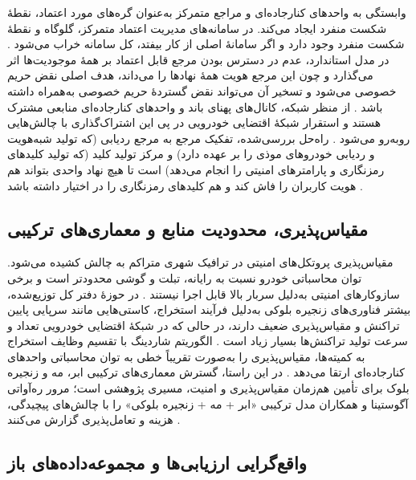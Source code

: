 \documentclass[12pt,a4paper]{article}
\begin{document}
وابستگی به واحد‌های کنارجاده‌ای  و مراجع متمرکز به‌عنوان گره‌های مورد اعتماد، نقطهٔ شکست منفرد  ایجاد می‌کند. در سامانه‌های مدیریت اعتماد متمرکز، گلوگاه و نقطهٔ شکست منفرد وجود دارد و اگر سامانهٔ اصلی از کار بیفتد، کل سامانه خراب می‌شود \cite{ghovanlooyghajarSBTMSScalableBlockchain2021}. در مدل استاندارد، عدم در دسترس بودن مرجع قابل اعتماد بر همهٔ موجودیت‌ها اثر می‌گذارد و چون این مرجع هویت همهٔ نهاد‌ها را می‌داند، هدف اصلی نقض حریم خصوصی می‌شود و تسخیر آن می‌تواند نقض گستردهٔ حریم خصوصی به‌همراه داشته باشد \cite{rahmawatiagustinaSystematicLiteratureReview2025}. از منظر شبکه، کانال‌های پهنای باند و واحد‌های کنارجاده‌ای منابعی مشترک هستند و استقرار شبکهٔ اقتضایی خودرویی در پی این اشتراک‌گذاری با چالش‌هایی روبه‌رو می‌شود \cite{hozouriOverviewVANETVehicular2023}. راه‌حل بررسی‌شده، تفکیک مرجع به مرجع ردیابی (که تولید شبه‌هویت و ردیابی خودرو‌های موذی را بر عهده دارد) و مرکز تولید کلید (که تولید کلید‌های رمزنگاری و پارامتر‌های امنیتی را انجام می‌دهد) است تا هیچ نهاد واحدی بتواند هم هویت کاربران را فاش کند و هم کلید‌های رمزنگاری را در اختیار داشته باشد \cite{rahmawatiagustinaSystematicLiteratureReview2025}.

\subsection{مقیاس‌پذیری، محدودیت منابع و معماری‌های ترکیبی}

مقیاس‌پذیری پروتکل‌های امنیتی در ترافیک شهری متراکم به چالش کشیده می‌شود. توان محاسباتی خودرو نسبت به رایانه، تبلت و گوشی محدودتر است و برخی سازوکار‌های امنیتی به‌دلیل سربار بالا قابل اجرا نیستند \cite{farsimadanReviewSecurityChallenges2025}. در حوزهٔ دفتر کل توزیع‌شده، بیشتر فناوری‌های زنجیره بلوکی به‌دلیل فرآیند استخراج، کاستی‌هایی مانند سرپایی پایین تراکنش و مقیاس‌پذیری ضعیف دارند، در حالی که در شبکهٔ اقتضایی خودرویی تعداد و سرعت تولید تراکنش‌ها بسیار زیاد است \cite{ghovanlooyghajarSBTMSScalableBlockchain2021}. الگوریتم شاردینگ با تقسیم وظایف استخراج به کمیته‌ها، مقیاس‌پذیری را به‌صورت تقریباً خطی به توان محاسباتی واحد‌های کنارجاده‌ای ارتقا می‌دهد \cite{ghovanlooyghajarSBTMSScalableBlockchain2021}. در این راستا، گسترش معماری‌های ترکیبی ابر، مه و زنجیره بلوک برای تأمین هم‌زمان مقیاس‌پذیری و امنیت، مسیری پژوهشی است؛ مرور ره‌آواتی آگوستینا و همکاران مدل ترکیبی «ابر + مه + زنجیره بلوکی» را با چالش‌های پیچیدگی، هزینه و تعامل‌پذیری گزارش می‌کنند \cite{rahmawatiagustinaSystematicLiteratureReview2025}.

\subsection{واقع‌گرایی ارزیابی‌ها و مجموعه‌داده‌های باز}
\end{document}
